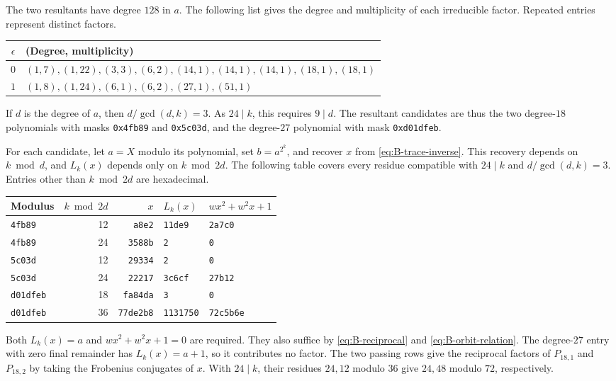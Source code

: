 \documentclass[11pt]{article}
\theoremstyle{definition}
\theoremstyle{remark}
\begin{document}
The two resultants have degree $128$ in $a$.
The following list gives the degree and multiplicity of each
irreducible factor. Repeated entries represent distinct factors.
\begin{center}\small
\begin{tabular}{@{}cl@{}}
\toprule
$\epsilon$ & (Degree, multiplicity)\\
\midrule
$0$ & $(1,7),(1,22),(3,3),(6,2),(14,1),(14,1),(14,1),(18,1),(18,1)$\\
$1$ & $(1,8),(1,24),(6,1),(6,2),(27,1),(51,1)$\\
\bottomrule
\end{tabular}
\end{center}
If $d$ is the degree of $a$, then $d/\gcd(d,k)=3$. As $24\mid k$,
this requires $9\mid d$. The resultant candidates are thus
the two degree-$18$ polynomials with masks \texttt{0x4fb89}
and \texttt{0x5c03d}, and the degree-$27$ polynomial
with mask \texttt{0xd01dfeb}.

For each candidate, let $a=X$ modulo its polynomial, set $b=a^{2^k}$,
and recover $x$ from \eqref{eq:B-trace-inverse}. This recovery
depends on $k\bmod d$, and $L_k(x)$ depends only on $k\bmod 2d$.
The following table covers every residue compatible with $24\mid k$
and $d/\gcd(d,k)=3$. Entries other than $k\bmod 2d$ are hexadecimal.
\begin{center}\small
\begin{tabular}{@{}lrrll@{}}
\toprule
Modulus & $k\bmod 2d$ & $x$ & $L_k(x)$ & $wx^2+w^2x+1$\\
\midrule
\texttt{4fb89} & 12 & \texttt{a8e2} & \texttt{11de9} & \texttt{2a7c0}\\
\texttt{4fb89} & 24 & \texttt{3588b} & \texttt{2} & \texttt{0}\\
\texttt{5c03d} & 12 & \texttt{29334} & \texttt{2} & \texttt{0}\\
\texttt{5c03d} & 24 & \texttt{22217} & \texttt{3c6cf} & \texttt{27b12}\\
\texttt{d01dfeb} & 18 & \texttt{fa84da} & \texttt{3} & \texttt{0}\\
\texttt{d01dfeb} & 36 & \texttt{77de2b8} & \texttt{1131750} & \texttt{72c5b6e}\\
\bottomrule
\end{tabular}
\end{center}
Both $L_k(x)=a$ and $wx^2+w^2x+1=0$ are required. They also
suffice by \eqref{eq:B-reciprocal} and \eqref{eq:B-orbit-relation}.
The degree-$27$ entry with zero final remainder has
$L_k(x)=a+1$, so it contributes no factor.
The two passing rows give the reciprocal factors of $P_{18,1}$
and $P_{18,2}$ by taking the Frobenius conjugates of $x$.
With $24\mid k$, their residues $24,12$ modulo $36$ give
$24,48$ modulo $72$, respectively.
\end{document}
